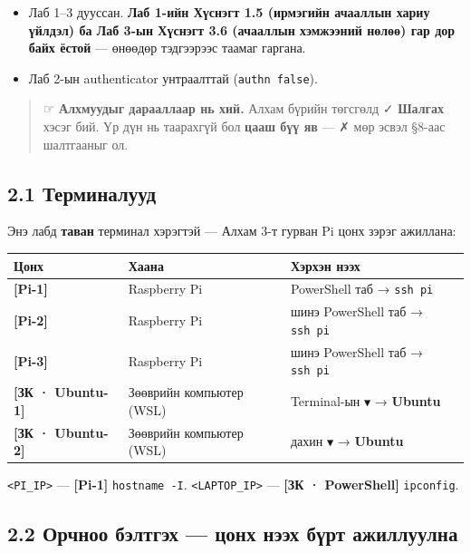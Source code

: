 \begin{itemize}
\tightlist
\item
  Лаб 1--3 дууссан. \textbf{Лаб 1-ийн Хүснэгт 1.5 (ирмэгийн ачааллын хариу үйлдэл) ба Лаб 3-ын Хүснэгт 3.6 (ачааллын хэмжээний нөлөө) гар дор байх ёстой} --- өнөөдөр тэдгээрээс таамаг гаргана.
\item
  Лаб 2-ын authenticator унтраалттай (\texttt{authn\ false}).
\end{itemize}

\begin{quote}
☞ \textbf{Алхмуудыг дарааллаар нь хий.} Алхам бүрийн төгсгөлд ✓ \textbf{Шалгах} хэсэг бий. Үр дүн нь таарахгүй бол \textbf{цааш бүү яв} --- ✗ мөр эсвэл §8-аас шалтгааныг ол.
\end{quote}

\hypertarget{ux442ux435ux440ux43cux438ux43dux430ux43bux443ux443ux434}{%
\subsection{2.1 Терминалууд}\label{ux442ux435ux440ux43cux438ux43dux430ux43bux443ux443ux434}}

Энэ лабд \textbf{таван} терминал хэрэгтэй --- Алхам 3-т гурван Pi цонх зэрэг ажиллана:

\begingroup\scriptsize\begin{longtable}[]{@{}lll@{}}
\toprule
Цонх & Хаана & Хэрхэн нээх\tabularnewline
\midrule
\endhead
\textbf{{[}Pi-1{]}} & Raspberry Pi & PowerShell таб → \texttt{ssh\ pi}\tabularnewline
\textbf{{[}Pi-2{]}} & Raspberry Pi & шинэ PowerShell таб → \texttt{ssh\ pi}\tabularnewline
\textbf{{[}Pi-3{]}} & Raspberry Pi & шинэ PowerShell таб → \texttt{ssh\ pi}\tabularnewline
\textbf{{[}ЗК · Ubuntu-1{]}} & Зөөврийн компьютер (WSL) & Terminal-ын \texttt{▼} → \textbf{Ubuntu}\tabularnewline
\textbf{{[}ЗК · Ubuntu-2{]}} & Зөөврийн компьютер (WSL) & дахин \texttt{▼} → \textbf{Ubuntu}\tabularnewline
\bottomrule
\end{longtable}\endgroup

\texttt{\textless{}PI\_\allowbreak{}IP\textgreater{}} --- \textbf{{[}Pi-1{]}} \texttt{hostname\ -I}. \texttt{\textless{}LAPTOP\_\allowbreak{}IP\textgreater{}} --- \textbf{{[}ЗК · PowerShell{]}} \texttt{ipconfig}.

\hypertarget{ux43eux440ux447ux43dux43eux43e-ux431ux44dux43bux442ux433ux44dux445-ux446ux43eux43dux445-ux43dux44dux44dux445-ux431ux4afux440ux442-ux430ux436ux438ux43bux43bux443ux443ux43bux43dux430}{%
\subsection{\texorpdfstring{2.2 Орчноо бэлтгэх --- \textbf{цонх нээх бүрт} ажиллуулна}{2.2 Орчноо бэлтгэх --- цонх нээх бүрт ажиллуулна}}\label{ux43eux440ux447ux43dux43eux43e-ux431ux44dux43bux442ux433ux44dux445-ux446ux43eux43dux445-ux43dux44dux44dux445-ux431ux4afux440ux442-ux430ux436ux438ux43bux43bux443ux443ux43bux43dux430}}

